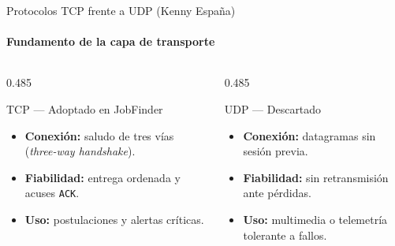 \documentclass[aspectratio=169,10pt]{beamer}
\begin{document}
\begin{frame}{Protocolos TCP frente a UDP (Kenny España)}
  \framesubtitle{Fundamento de la capa de transporte \cite{ref2,guo2025tcpudp}}
  \vspace{0.2cm}
  \begin{columns}[T,totalwidth=\textwidth]
    \begin{column}{0.485\textwidth}
      \begin{bluecard}{TCP --- Adoptado en JobFinder}
        \begin{itemize}\setlength{\itemsep}{6pt}
          \item \textbf{Conexión:} saludo de tres vías (\textit{three-way handshake}).
          \item \textbf{Fiabilidad:} entrega ordenada y acuses \texttt{ACK}.
          \item \textbf{Uso:} postulaciones y alertas críticas.
        \end{itemize}
      \end{bluecard}
    \end{column}
    \begin{column}{0.485\textwidth}
      \begin{ambercard}{UDP --- Descartado}
        \begin{itemize}\setlength{\itemsep}{6pt}
          \item \textbf{Conexión:} datagramas sin sesión previa.
          \item \textbf{Fiabilidad:} sin retransmisión ante pérdidas.
          \item \textbf{Uso:} multimedia o telemetría tolerante a fallos.
        \end{itemize}
      \end{ambercard}
    \end{column}
  \end{columns}
\end{frame}
\end{document}
